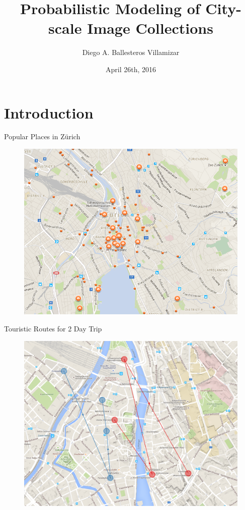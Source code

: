 \documentclass{beamer}
\title[M.Sc. Thesis 2015]{Probabilistic Modeling of City-scale Image Collections}
\author{Diego A. Ballesteros Villamizar}
\institute[ETHZ]{ETH Zürich}
\date{April 26th, 2016}
\begin{document}
\begin{frame}
  \titlepage
\end{frame}

\section{Introduction}

\begin{frame}{Popular Places in Zürich}
  \begin{figure}
    \centering
    \includegraphics[scale=0.35]{tripadvisor}
  \end{figure}
\end{frame}

\begin{frame}{Touristic Routes for 2 Day Trip}
  \begin{figure}
    \centering
    \includegraphics[scale=0.22]{routes_1}
  \end{figure}
\end{frame}
\end{document}
